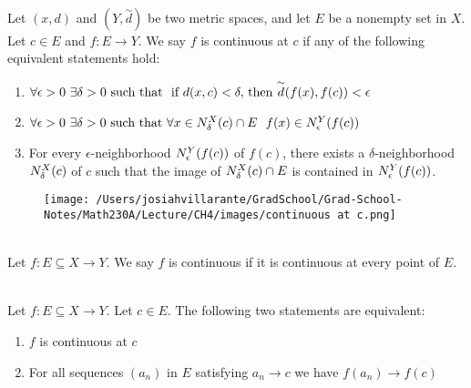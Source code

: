 \begin{definition} \leavevmode \\
    Let $(x,d)$ and $(Y, \overset{\sim}{d})$ be two metric spaces, and let $E$ be a nonempty set in $X$. Let $c \in E$ and $f: E \to Y$. We say $f$ is continuous at $c$ if any of the following equivalent statements hold:
    \begin{enumerate}[$(i)$]
        \item $\forall \epsilon > 0 ~\exists \delta > 0 \text{ such that } \text{ if $d(x,c) < \delta,$ then $\overset{\sim}{d}(f(x), f(c)) < \epsilon$}$
        \item $\forall \epsilon > 0 ~\exists \delta > 0 \text{ such that } \forall x \in N_{\delta}^{X}(c)\cap E ~~f(x)\in N_{\epsilon}^{Y}(f(c))$
        \item For every $\epsilon$-neighborhood $N_{\epsilon}^{Y}(f(c))$ of $f(c)$, there exists a $\delta$-neighborhood $N_{\delta}^{X}(c)$ of $c$ such that the image of $N_{\delta}^{X}(c)\cap E$ is contained in $N_{\epsilon}^{Y}(f(c))$.
    \end{enumerate}
\end{definition}
\begin{figure}[h]
    \texttt{[image: /Users/josiahvillarante/GradSchool/Grad-School-Notes/Math230A/Lecture/CH4/images/continuous at c.png]}
\end{figure}

\begin{definition} \leavevmode \\
    Let $f:E\subseteq X \to Y$. We say $f$ is continuous if it is continuous at every point of $E$.
\end{definition}

\begin{theorem} \leavevmode \\
    Let $f: E\subseteq X \to Y$. Let $c \in E.$ The following two statements are equivalent:
    \begin{enumerate}[$(i)$]
        \item $f$ is continuous at $c$
        \item For all sequences $(a_n)$ in $E$ satisfying $a_n \to c$ we have $f(a_n) \to f(c)$ 
    \end{enumerate}
\end{theorem}

